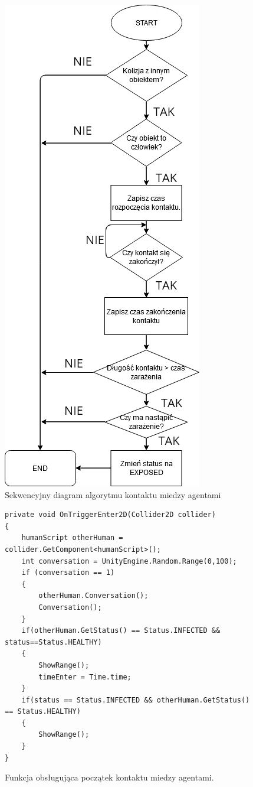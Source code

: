 \begin{figure}[h!]
	\centering
	\includegraphics[width=0.6\linewidth]{DiagramKontaktu.png}
	\caption{Sekwencyjny diagram algorytmu kontaktu miedzy agentami}
	\label{diagramZarazanie}
\end{figure}

\begin{figure}
\centering
\begin{lstlisting}
private void OnTriggerEnter2D(Collider2D collider)
{
	humanScript otherHuman = collider.GetComponent<humanScript>();
	int conversation = UnityEngine.Random.Range(0,100);
	if (conversation == 1)
	{
		otherHuman.Conversation();
		Conversation();
	}
	if(otherHuman.GetStatus() == Status.INFECTED && status==Status.HEALTHY)
	{
		ShowRange();
		timeEnter = Time.time;
	}
	if(status == Status.INFECTED && otherHuman.GetStatus() == Status.HEALTHY)
	{
		ShowRange();
	}
}
\end{lstlisting}
\caption{Funkcja obsługująca początek kontaktu miedzy agentami.}
\label{fig:kod:OnTriggerEnter}
\end{figure}

